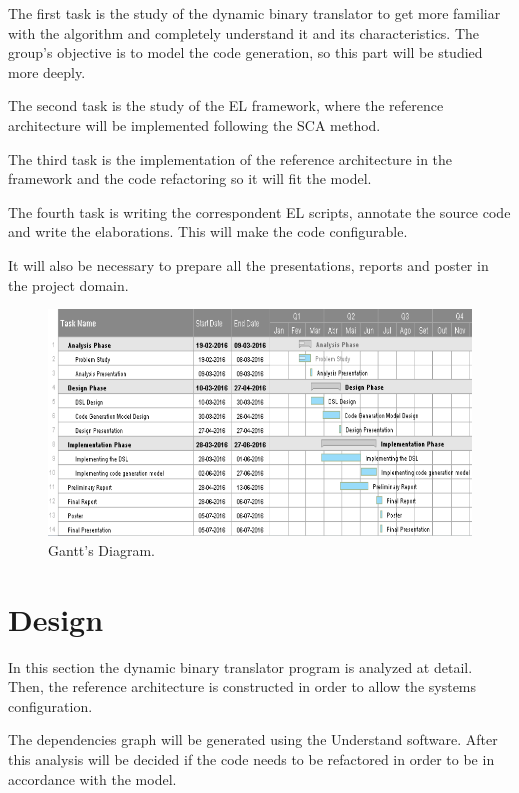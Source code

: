 \documentclass{report}
\begin{document}
	\par The first task is the study of the dynamic binary translator to get more familiar with the algorithm and completely understand it and its characteristics. The group's objective is to model the code generation, so this part will be studied more deeply.
	\par The second task is the study of the EL framework, where the reference architecture will be implemented following the SCA method.
	\par The third task is the implementation of the reference architecture in the framework and the code refactoring so it will fit the model. 
	\par The fourth task is writing the correspondent EL scripts, annotate the source code and write the elaborations. This will make the code configurable.
	\par It will also be necessary to prepare all the presentations, reports and poster in the project domain.
	
	\begin{figure} [H]
		\centering
		\includegraphics[width=1\linewidth]{Images/gantt}
		\caption{Gantt's Diagram.}
		\label{fig:gantt}
	\end{figure}
	



\chapter{Design}

	\par In this section the dynamic binary translator program is analyzed at detail. Then, the reference architecture is constructed in order to allow the systems configuration. 
	\par The dependencies graph will be generated using the Understand software. After this analysis will be decided if the code needs to be refactored in order to be in accordance with the model. 
	
\end{document}
